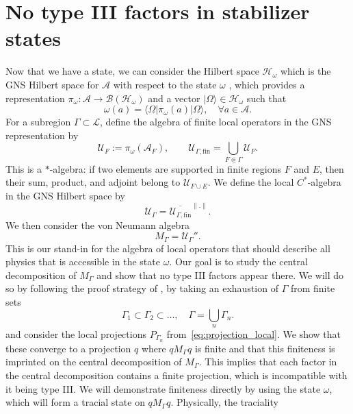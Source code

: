 \documentclass[aps,pra,reprint,superscriptaddress]{revtex4-2}
\newcommand{\cA}{{\mathcal A}}
\newcommand{\cB}{{\mathcal B}}
\newcommand{\cH}{{\mathcal H}}
\newcommand{\cL}{{\mathcal L}}
\newcommand{\cU}{{\mathcal U}}
\newcommand\G{\Gamma}
\newcommand\w{\omega}
\newcommand\W{\Omega}
\providecommand{\ket}[1]{\lvert #1\rangle}
\providecommand{\bra}[1]{\langle #1\rvert}
\providecommand{\norm}[1]{\lVert #1\rVert}
\theoremstyle{definition}
\theoremstyle{remark}
\begin{document}
\section{No type III factors in stabilizer states}\label{app:notypeIII}
Now that we have a state, we can consider the Hilbert space $\cH_\w$ which
is the GNS Hilbert space for $\cA$ with respect to the state $\w$
\cite[II.6.4]{Blackadar}, which provides a representation $\pi_\w : \cA
\rightarrow \cB(\cH_\w)$ and a vector $\ket{\W} \in \cH_\w$ such that 
\begin{equation}
    \w(a) = \bra{\W}\pi_\w(a) \ket{\W},\quad \forall a \in \cA.
\end{equation}
For a subregion $\G \subset \cL$, define the algebra of finite local
operators in the GNS representation by
\begin{equation}
    \cU_F:=\pi_\w(\cA_F),
    \qquad
    \cU_{\G,\mathrm{fin}} = \bigcup_{F \Subset \G} \cU_F.
\end{equation}
This is a $\ast$-algebra: if two elements are supported in finite regions $F$
and $E$, then their sum, product, and adjoint belong to
$\cU_{F\cup E}$. We define the local $C^\ast$-algebra in the GNS Hilbert
space by
\begin{equation}
    \cU_{\G} = \overline{\cU_{\G,\mathrm{fin}}}^{\norm{.}}.
\end{equation}
We then consider the von Neumann algebra
\begin{equation}
    M_\G = \cU_\G''.
\end{equation}
This is our stand-in for the algebra of local operators that should describe
all physics that is accessible in the state $\w$.
Our goal is to study the central decomposition of $M_\G$ and show that no type
III factors appear there. We will do so by following the proof strategy of
\cite{Ogata:2022qdm}, by taking an exhaustion of $\G$ from
finite sets
\begin{equation}
    \G_1 \subset \G_2 \subset \hdots, \quad \G = \bigcup_{n} \G_n.
\end{equation}
and consider the local projections $P_{\G_n}$ from~\eqref{eq:projection_local}. We show that these converge to a
projection $q$ where $q M_\G q$ is finite and that this finiteness is imprinted on the central decomposition of $M_\G$. This implies that each factor in the
central decomposition contains a finite projection, which is incompatible with
it being type III. We will demonstrate finiteness directly by using the state
$\w$, which will form a tracial state on $q M_\G q$. Physically, the traciality
\end{document}
